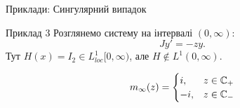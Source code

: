 \begin{frame}{Приклади: Сингулярний випадок}
	\begin{block}{Приклад 3}
		Розглянемо систему на інтервалі $(0,\infty)$:
		\begin{equation}\label{eq-4.28}
			Jy'=-zy.
		\end{equation}
		Тут $H(x)=I_2\in L^1_{loc}[0,\infty)$, але $H\notin L^1(0,\infty)$.
	\end{block}

	\begin{equation*}
		m_\infty(z) = 
		\begin{cases}{}
			i, & z\in\mathbb{C}_+\\
			-i, & z\in\mathbb{C}_-
		\end{cases}
	\end{equation*}
\end{frame}
